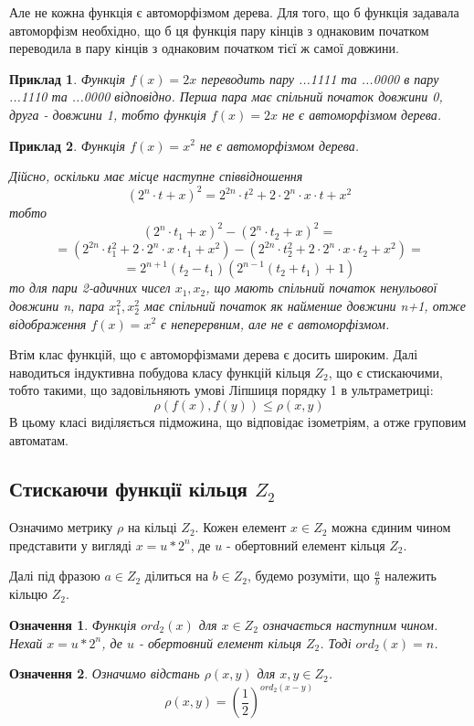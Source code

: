 \documentclass[a4paper,12pt]{article} \usepackage{a4wide}
\numberwithin{equation}{subsection}
\newtheorem{definition}{Означення}[subsection]
\newtheorem{example}{Приклад}[subsection]
\begin{document}
Але не кожна функція є автоморфізмом дерева. Для того, що б функція
задавала автоморфізм необхідно, що б ця функція пару кінців з
однаковим початком переводила в пару кінців з однаковим початком тієї
ж самої довжини.
\begin{example}
  Функція $f(x)=2x$ переводить пару ...1111 та ...0000 в пару ...1110
  та ...0000 відповідно. Перша пара має спільний початок довжини 0,
  друга - довжини 1, тобто функція $f(x)=2x$ не є автоморфізмом
  дерева.
\end{example}
\begin{example}
  Функція $f(x)=x^2$ не є автоморфізмом дерева.

  Дійсно, оскільки має місце наступне співвідношення $$(2^n\cdot
  t+x)^2=2^{2n}\cdot t^2+2\cdot 2^n\cdot x\cdot t+x^2$$
  тобто $$(2^n\cdot t_1+x)^2-(2^n\cdot t_2+x)^2=$$ $$=(2^{2n}\cdot
  t_1^2+2\cdot 2^n\cdot x\cdot t_1+x^2)-(2^{2n}\cdot t_2^2+2\cdot
  2^n\cdot x\cdot t_2+x^2)=$$$$=
  2^{n+1}(t_2-t_1)(2^{n-1}(t_2+t_1)+1)$$ то для пари 2-адичних чисел
  $x_1,x_2$, що мають спільний початок ненульової довжини n, пара
  $x_1^2,x_2^2$ має спільний початок  як найменше довжини n+1,
  отже відображення $f(x)=x^2$ є неперервним, але не є автоморфізмом.
\end{example}

Втім клас функцій, що є автоморфізмами дерева є досить широким. Далі
наводиться індуктивна побудова класу функцій кільця $Z_2$, що є
стискаючими, тобто такими, що задовільняють умові Ліпшиця порядку 1 в ультраметриці:
$$\rho (f(x),f(y)) \leq \rho (x,y)$$
 В цьому класі виділяється підможина, що відповідає
ізометріям, а отже груповим автоматам.

\subsection{Стискаючи функції кільця $Z_2$}
Означимо метрику $\rho$ на кільці $Z_2$. Кожен елемент $x\in Z_2$
можна єдиним чином представити у вигляді $x=u*2^n$, де $u$ -
обертовний елемент кільця $Z_2$.

Далі під фразою $a\in Z_2$ ділиться на $b \in Z_2$, будемо розуміти,
що $\frac{a}{b}$ належить кільцю $Z_2$.
\begin{definition}

  Функція $ord_2(x)$ для $x\in Z_2$ означається наступним чином. Нехай
  $x=u*2^n$, де $u$ - обертовний елемент кільця $Z_2$. Тоді
  $ord_2(x)=n$.
\end{definition}

  \begin{definition}
    Означимо відстань $\rho(x,y)$ для $x,y \in
    Z_2$. $$\rho(x,y)=\left(\frac{1}{2}\right)^{ord_2(x-y)}$$
  \end{definition}
\end{document}
